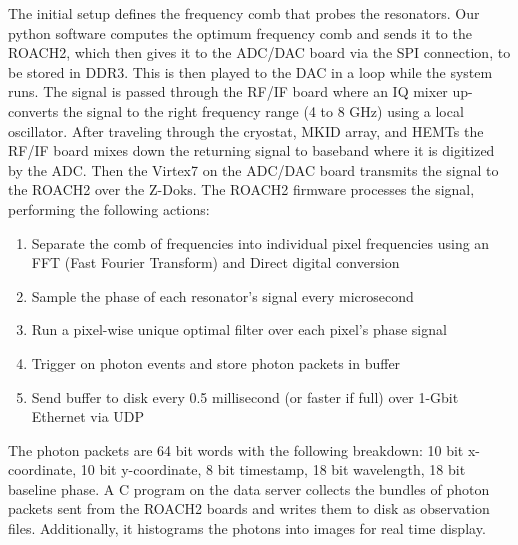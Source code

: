 \documentclass[../main.tex]{subfiles}
\begin{document}
The initial setup defines the frequency comb that probes the resonators. Our python software computes the optimum frequency comb and sends it to the ROACH2, which then gives it to the ADC/DAC board via the SPI connection, to be stored in DDR3. This is then played to the DAC in a loop while the system runs. The signal is passed through the RF/IF board where an IQ mixer up-converts the signal to the right frequency range (4 to 8 GHz) using a local oscillator. After traveling through the cryostat, MKID array, and HEMTs the RF/IF board mixes down the returning signal to baseband where it is digitized by the ADC. Then the Virtex7 on the ADC/DAC board transmits the signal to the ROACH2 over the Z-Doks. The ROACH2 firmware processes the signal, performing the following actions:
\begin{enumerate}
    \item Separate the comb of frequencies into individual pixel frequencies using an FFT (Fast Fourier Transform) and Direct digital conversion
    \item Sample the phase of each resonator's signal every microsecond
    \item Run a pixel-wise unique optimal filter over each pixel's phase signal
    \item Trigger on photon events and store photon packets in buffer
    \item Send buffer to disk every 0.5 millisecond (or faster if full) over 1-Gbit Ethernet via UDP
\end{enumerate}

The photon packets are 64 bit words with the following breakdown: 10 bit x-coordinate, 10 bit y-coordinate, 8 bit timestamp, 18 bit wavelength, 18 bit baseline phase. A C program on the data server collects the bundles of photon packets sent from the ROACH2 boards and writes them to disk as observation files. Additionally, it histograms the photons into images for real time display. 
\end{document}
